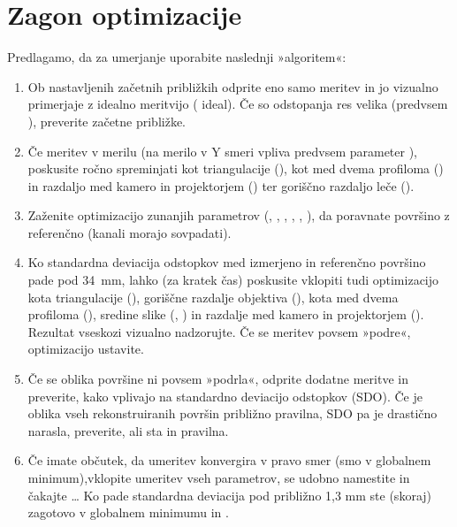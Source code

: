 \documentclass[letterpaper,10pt,english]{sphinxmanual}
\begin{document}
\section{Zagon optimizacije}
\label{\detokenize{kalibracija:zagon-optimizacije}}
\sphinxAtStartPar
Predlagamo, da za umerjanje uporabite naslednji »algoritem«:
\begin{enumerate}
%
\item {} 
\sphinxAtStartPar
Ob nastavljenih začetnih približkih odprite eno samo meritev in jo vizualno primerjaje z idealno meritvijo ( ideal). Če so odstopanja res velika (predvsem ), preverite začetne približke.

\item {} 
\sphinxAtStartPar
Če meritev  v merilu (na merilo v Y smeri vpliva predvsem parameter ), poskusite ročno spreminjati kot triangulacije (), kot med dvema profiloma () in razdaljo med kamero in projektorjem () ter goriščno razdaljo leče ().

\item {} 
\sphinxAtStartPar
Zaženite optimizacijo zunanjih parametrov (, , , , , ), da poravnate površino z referenčno (kanali morajo sovpadati).

\item {} 
\sphinxAtStartPar
Ko standardna deviacija odstopkov med izmerjeno in referenčno površino pade pod 3\sphinxhyphen{}4 mm, lahko (za kratek čas) poskusite vklopiti tudi optimizacijo kota triangulacije (), goriščne razdalje objektiva (), kota med dvema profiloma (), sredine slike (, ) in razdalje med kamero in projektorjem (). Rezultat vseskozi vizualno nadzorujte. Če se meritev povsem »podre«, optimizacijo ustavite.

\item {} 
\sphinxAtStartPar
Če se oblika površine ni povsem »podrla«, odprite dodatne meritve in preverite, kako vplivajo na standardno deviacijo odstopkov (SDO). Če je oblika vseh rekonstruiranih površin približno pravilna, SDO pa je drastično narasla, preverite, ali sta  in  pravilna.

\item {} 
\sphinxAtStartPar
Če imate občutek, da umeritev konvergira v pravo smer (smo v globalnem minimum),vklopite umeritev vseh parametrov, se udobno namestite in čakajte … Ko pade standardna deviacija pod približno 1,3 mm ste (skoraj) zagotovo v globalnem minimumu in .

\end{enumerate}
\end{document}
